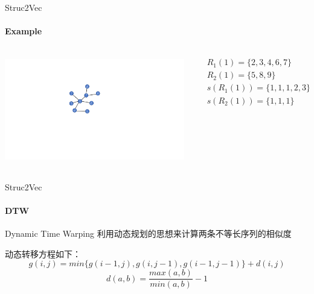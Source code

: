 \documentclass{beamer}
\begin{document}
\begin{frame}{Struc2Vec}
    \framesubtitle{Example}
    \begin{columns}
        \begin{column}{0.5\textwidth}
            \centering\includegraphics[height=4.6cm]{struc2vec_example.pdf}
        \end{column}
        \begin{column}{0.5\textwidth}
            \begin{example}
                \begin{align*}
                    & R_1(1)=\{2,3,4,6,7\} \\
                    & R_2(1)=\{5,8,9\}\\
                    & s(R_1(1))=\{1,1,1,2,3\}\\
                    & s(R_2(1))=\{1,1,1\} \\
                \end{align*}
            \end{example}
        \end{column}
    \end{columns}
\end{frame}
\begin{frame}{Struc2Vec}
    \framesubtitle{DTW}
    \begin{block}{Dynamic Time Warping}
        利用动态规划的思想来计算两条不等长序列的相似度
    \end{block}
    动态转移方程如下：
    $$
    g(i, j) = min\{g(i-1, j),g(i, j-1),g(i-1, j-1)\} + d(i, j)
    $$
    $$d(a, b) = \frac{max(a, b)}{min(a, b)} - 1$$
\end{frame}
\end{document}
